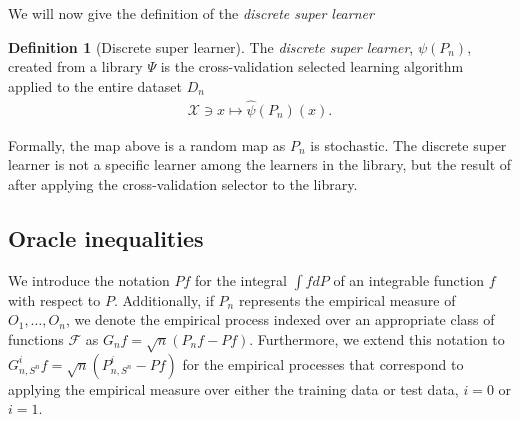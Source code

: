 \documentclass[11pt, a4paper]{article}
\theoremstyle{definition}
\newtheorem{definition}[theorem]{Definition}
\theoremstyle{remark}
\newcommand{\la}{\psi}
\newcommand{\Sn}{S^n}
\newcommand{\lib}{\Psi}
\begin{document}
We will now give the definition of the \textit{discrete super learner}  
\begin{definition}[Discrete super learner]
    The \textit{discrete super learner}, $ \la(P_n) $, created from a library $ \lib $ is the cross-validation selected learning algorithm applied to the entire dataset $ D_n $  
    \begin{align*}
        \mathcal{X} \ni x \mapsto \hat{\la}(P_n)(x). 
    \end{align*}
\end{definition}
Formally, the map above is a random map as $ P_n $ is stochastic. The discrete super learner is not a specific learner among the learners in the library, but the result of after applying the cross-validation selector to the library. 

\subsection{Oracle inequalities}
We introduce the notation $Pf$ for the integral $\int f dP$ of an integrable function $f$ with respect to $P$. Additionally, if $P_n$ represents the empirical measure of $O_1, \dots, O_n$, we denote the empirical process indexed over an appropriate class of functions $\mathcal{F}$ as $G_n f = \sqrt{n}(P_n f - P f)$. Furthermore, we extend this notation to $G_{n, \Sn}^{i} f = \sqrt{n}(P_{n, \Sn}^{i} - Pf)$ for the empirical processes that correspond to applying the empirical measure over either the training data or test data, $ i = 0 $ or $ i = 1 $.
\end{document}
